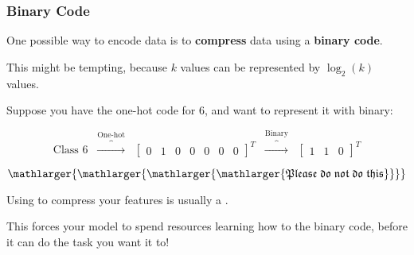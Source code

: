             \subsubsection*{Binary Code}

                One possible way to encode data is to \textbf{compress} data using a \textbf{binary code}.

                This might be tempting, because $k$ values can be represented by $\log_2(k)$ values.

                \miniex Suppose you have the one-hot code for $6$, and want to represent it with binary:

                \begin{equation}
                    \text{Class 6} 
                    \;\;\overbrace{\longrightarrow}^{\text{One-hot}}\;\;
                    \begin{bmatrix}
                        0 & 1 & 0 & 0 & 0 & 0 & 0
                    \end{bmatrix}^T
                    \;\;\overbrace{\longrightarrow}^{\text{Binary}}\;\;
                    \begin{bmatrix}
                        1 & 1 & 0
                    \end{bmatrix}^T
                \end{equation}

                \begin{equation*}
                    \mathlarger{\mathlarger{\mathlarger{\mathlarger{
                        \mathfrak{Please\;do\;not\;do\;this}
                    }}}}
                \end{equation*}

                \begin{concept}
                    Using  to compress your features is usually a .

                    This forces your model to spend resources learning how to  the binary code, before it can do the task you want it to!
                \end{concept}

            \subsecdiv